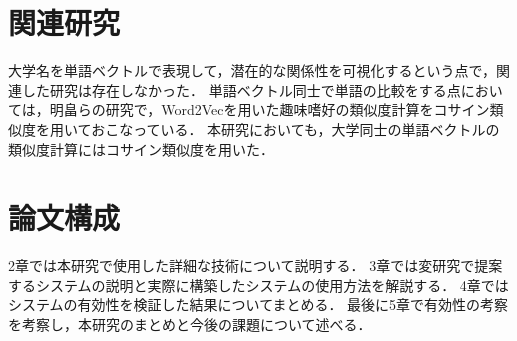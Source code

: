 \section{関連研究}
大学名を単語ベクトルで表現して，潜在的な関係性を可視化するという点で，関連した研究は存在しなかった．
単語ベクトル同士で単語の比較をする点においては，明畠ら\cite{thesis1}の研究で，Word2Vecを用いた趣味嗜好の類似度計算をコサイン類似度を用いておこなっている．
本研究においても，大学同士の単語ベクトルの類似度計算にはコサイン類似度を用いた．

\section{論文構成}
2章では本研究で使用した詳細な技術について説明する．
3章では変研究で提案するシステムの説明と実際に構築したシステムの使用方法を解説する．
4章ではシステムの有効性を検証した結果についてまとめる．
最後に5章で有効性の考察を考察し，本研究のまとめと今後の課題について述べる．